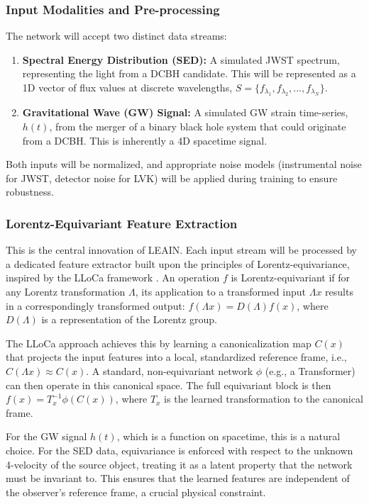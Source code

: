 \documentclass[11pt, a4paper]{article}
\begin{document}
\subsubsection{Input Modalities and Pre-processing}
The network will accept two distinct data streams:
\begin{enumerate}
    \item \textbf{Spectral Energy Distribution (SED):} A simulated JWST spectrum, representing the light from a DCBH candidate. This will be represented as a 1D vector of flux values at discrete wavelengths, $S = \{f_{\lambda_1}, f_{\lambda_2}, ..., f_{\lambda_N}\}$.
    \item \textbf{Gravitational Wave (GW) Signal:} A simulated GW strain time-series, $h(t)$, from the merger of a binary black hole system that could originate from a DCBH. This is inherently a 4D spacetime signal.
\end{enumerate}
Both inputs will be normalized, and appropriate noise models (instrumental noise for JWST, detector noise for LVK) will be applied during training to ensure robustness.

\subsubsection{Lorentz-Equivariant Feature Extraction}
This is the central innovation of LEAIN. Each input stream will be processed by a dedicated feature extractor built upon the principles of Lorentz-equivariance, inspired by the LLoCa framework \cite{paper1_lloca}. An operation $f$ is Lorentz-equivariant if for any Lorentz transformation $\Lambda$, its application to a transformed input $\Lambda x$ results in a correspondingly transformed output: $f(\Lambda x) = D(\Lambda) f(x)$, where $D(\Lambda)$ is a representation of the Lorentz group.

The LLoCa approach achieves this by learning a canonicalization map $C(x)$ that projects the input features into a local, standardized reference frame, i.e., $C(\Lambda x) \approx C(x)$. A standard, non-equivariant network $\phi$ (e.g., a Transformer) can then operate in this canonical space. The full equivariant block is then $f(x) = T_x^{-1} \phi(C(x))$, where $T_x$ is the learned transformation to the canonical frame.

For the GW signal $h(t)$, which is a function on spacetime, this is a natural choice. For the SED data, equivariance is enforced with respect to the unknown 4-velocity of the source object, treating it as a latent property that the network must be invariant to. This ensures that the learned features are independent of the observer's reference frame, a crucial physical constraint.
\end{document}
